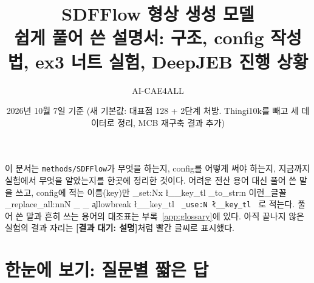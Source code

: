 \documentclass[11pt]{article}
\title{\textbf{SDFFlow 형상 생성 모델}\\[4pt]\large 쉽게 풀어 쓴 설명서: 구조, config 작성법, ex3 너트 실험, DeepJEB 진행 상황}
\author{AI-CAE4ALL}
\date{2026년 10월 7일 기준 (새 기본값: 대표점 128 + 2단계 처방. Thingi10k를 빼고 세 데이터로 정리, MCB 재구축 결과 추가)}
\newcommand{\pending}[1]{\textcolor{red!70!black}{\textbf{[결과 대기: #1]}}}
\DeclareRobustCommand{\key}[1]{
  \tl_set:Nx \l__key_tl { \tl_to_str:n {#1} }
  \regex_replace_all:nnN { \_ } { \cO\_ \c{allowbreak} } \l__key_tl
  \texttt{ \tl_use:N \l__key_tl }
}
\begin{document}
\maketitle

\noindent 이 문서는 \texttt{methods/SDFFlow}가 무엇을 하는지, config를 어떻게 써야 하는지,
지금까지 실험에서 무엇을 알았는지를 한곳에 정리한 것이다. 어려운 전산 용어 대신 풀어 쓴 말을 쓰고,
config에 적는 이름(key)만 \key{이런_글꼴}로 적는다. 풀어 쓴 말과 흔히 쓰는 용어의 대조표는
부록~\ref{app:glossary}에 있다. 아직 끝나지 않은 실험의 결과 자리는 \pending{설명}처럼 빨간 글씨로 표시했다.

\section*{한눈에 보기: 질문별 짧은 답}
\end{document}
